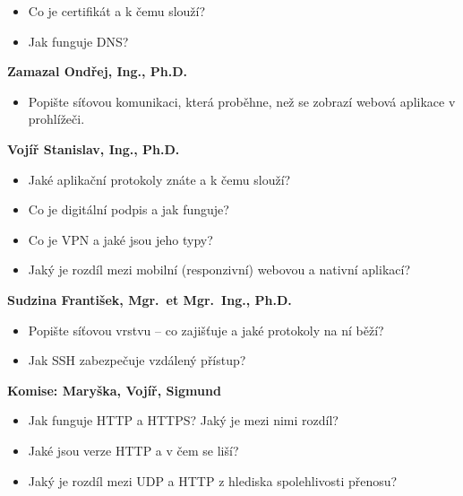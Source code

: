 \begin{profesorbox}
\begin{itemize}
  \item Co je certifikát a k čemu slouží?
  \item Jak funguje DNS?
\end{itemize}
\textbf{Zamazal Ondřej, Ing., Ph.D.}
\begin{itemize}
  \item Popište síťovou komunikaci, která proběhne, než se zobrazí webová aplikace v prohlížeči.
\end{itemize}
\textbf{Vojíř Stanislav, Ing., Ph.D.}
\begin{itemize}
  \item Jaké aplikační protokoly znáte a k čemu slouží?
  \item Co je digitální podpis a jak funguje?
  \item Co je VPN a jaké jsou jeho typy?
  \item Jaký je rozdíl mezi mobilní (responzivní) webovou a nativní aplikací?
\end{itemize}
\textbf{Sudzina František, Mgr.\ et Mgr.\ Ing., Ph.D.}
\begin{itemize}
  \item Popište síťovou vrstvu -- co zajišťuje a jaké protokoly na ní běží?
  \item Jak SSH zabezpečuje vzdálený přístup?
\end{itemize}
\textbf{Komise: Maryška, Vojíř, Sigmund}
\begin{itemize}
  \item Jak funguje HTTP a HTTPS? Jaký je mezi nimi rozdíl?
  \item Jaké jsou verze HTTP a v čem se liší?
  \item Jaký je rozdíl mezi UDP a HTTP z hlediska spolehlivosti přenosu?
\end{itemize}
\end{profesorbox}
